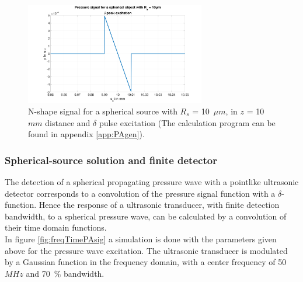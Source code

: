 \begin{figure}[H]
	\centering
	\includegraphics[width = 0.7\textwidth, height=0.3\textheight]{02_principles_of_photoacoustics/images/nShape.png}
	\caption{N-shape signal for a spherical source with $R_s$ = 10~$\mu m$, in $z$ = 10~$mm$ distance and $\delta$ pulse excitation (The calculation program can be found in appendix \ref{app:PAgen}).}
	\label{fig:nShape}
\end{figure}

\subsubsection{Spherical-source solution and finite detector}

The detection of a spherical propagating pressure wave with a pointlike ultrasonic detector corresponds to a convolution of the pressure signal function with a $\delta$-function. Hence the response of a ultrasonic transducer, with finite detection bandwidth, to a spherical pressure wave, can be calculated by a convolution of their time domain functions.\\
In figure \ref{fig:freqTimePAsig} a simulation is done with the parameters given above for the pressure wave excitation. The ultrasonic transducer is modulated by a Gaussian function in the frequency domain, with a center frequency of 50~$MHz$ and 70~$\%$ bandwidth.  

